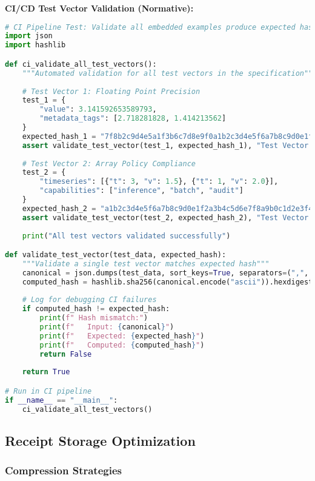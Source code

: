 \documentclass[12pt,a4paper]{article}
\begin{document}
\begin{technicalbox}
\textbf{CI/CD Test Vector Validation (Normative):}
\begin{lstlisting}[language=Python, caption=Automated Test Vector Hash Verification]
# CI Pipeline Test: Validate all embedded examples produce expected hashes
import json
import hashlib

def ci_validate_all_test_vectors():
    """Automated validation for all test vectors in the specification"""
    
    # Test Vector 1: Floating Point Precision
    test_1 = {
        "value": 3.141592653589793,
        "metadata_tags": [2.718281828, 1.414213562]
    }
    expected_hash_1 = "7f8b2c9d4e5a1f3b6c7d8e9f0a1b2c3d4e5f6a7b8c9d0e1f2a3b4c5d6e7f8a9b"
    assert validate_test_vector(test_1, expected_hash_1), "Test Vector 1 failed"
    
    # Test Vector 2: Array Policy Compliance  
    test_2 = {
        "timeseries": [{"t": 3, "v": 1.5}, {"t": 1, "v": 2.0}],
        "capabilities": ["inference", "batch", "audit"]
    }
    expected_hash_2 = "a1b2c3d4e5f6a7b8c9d0e1f2a3b4c5d6e7f8a9b0c1d2e3f4a5b6c7d8e9f0a1b2"
    assert validate_test_vector(test_2, expected_hash_2), "Test Vector 2 failed"
    
    print("All test vectors validated successfully")

def validate_test_vector(test_data, expected_hash):
    """Validate a single test vector matches expected hash"""
    canonical = json.dumps(test_data, sort_keys=True, separators=(",", ":"), ensure_ascii=True)
    computed_hash = hashlib.sha256(canonical.encode("ascii")).hexdigest()
    
    # Log for debugging CI failures
    if computed_hash != expected_hash:
        print(f" Hash mismatch:")
        print(f"   Input: {canonical}")
        print(f"   Expected: {expected_hash}")
        print(f"   Computed: {computed_hash}")
        return False
    
    return True

# Run in CI pipeline
if __name__ == "__main__":
    ci_validate_all_test_vectors()
\end{lstlisting}
\end{technicalbox}

\subsection{Receipt Storage Optimization}

\subsubsection{Compression Strategies}
\end{document}
